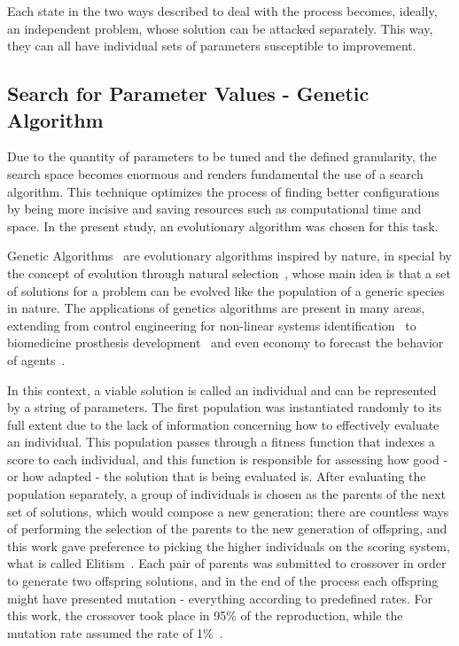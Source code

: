 	Each state in the two ways described to deal with the process becomes, ideally, an independent problem, whose solution can be attacked separately. This way, they can all have individual sets of parameters susceptible to improvement.
	
\subsection{Search for Parameter Values - Genetic Algorithm} \label{subsec:GA}
	
	Due to the quantity of parameters to be tuned and the defined granularity, the search space becomes enormous and renders fundamental the use of a search algorithm. This technique optimizes the process of finding better configurations by being more incisive and saving resources such as computational time and space. In the present study, an evolutionary algorithm was chosen for this task.
	
	Genetic Algorithms~\cite{GA} are evolutionary algorithms inspired by nature, in special by the concept of evolution through natural selection~\cite{Darwin}, whose main idea is that a set of solutions for a problem can be evolved like the population of a generic species in nature. The applications of genetics algorithms are present in many areas, extending from control engineering for non-linear systems identification~\cite{GACTRL} to biomedicine prosthesis development~\cite{GABIO} and even economy to forecast the behavior of agents~\cite{GAECO}.
	
	In this context, a viable solution is called an individual and can be represented by a string of parameters. The first population was instantiated randomly to its full extent due to the lack of information concerning how to effectively evaluate an individual. This population passes through a fitness function that indexes a score to each individual, and this function is responsible for assessing how good - or how adapted - the solution that is being evaluated is. After evaluating the population separately, a group of individuals is chosen as the parents of the next set of solutions, which would compose a new generation; there are countless ways of performing the selection of the parents to the new generation of offspring, and this work gave preference to picking the higher individuals on the scoring system, what is called Elitism~\cite{ELITISM}. Each pair of parents was submitted to crossover in order to generate two offspring solutions, and in the end of the process each offspring might have presented mutation - everything according to predefined rates. For this work, the crossover took place in 95\% of the reproduction, while the mutation rate assumed the rate of 1\%~\cite{RATES}.
	
